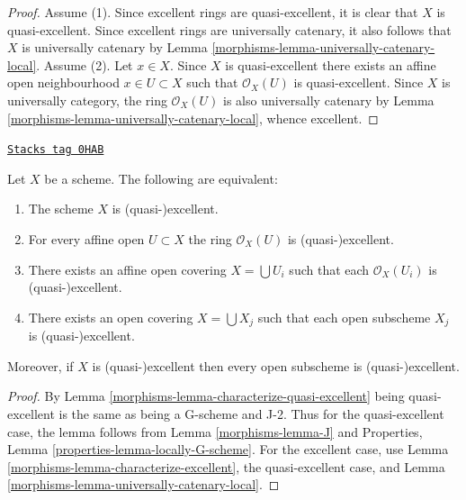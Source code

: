 \begin{proof}

Assume (1). Since excellent rings are quasi-excellent, it is clear
that $X$ is quasi-excellent. Since excellent rings are universally
catenary, it also follows that $X$ is universally catenary by
Lemma \ref{morphisms-lemma-universally-catenary-local}. Assume (2).
Let $x \in X$. Since $X$ is quasi-excellent there exists
an affine open neighbourhood $x \in U \subset X$
such that $\mathcal{O}_X(U)$ is quasi-excellent. Since
$X$ is universally category, the ring $\mathcal{O}_X(U)$ is also
universally catenary by Lemma \ref{morphisms-lemma-universally-catenary-local},
whence excellent.
\end{proof}

\begin{lemma}
\label{morphisms-lemma-locally-excellent}
\href{https://stacks.math.columbia.edu/tag/0HAB}{\texttt{Stacks tag 0HAB}}

Let $X$ be a scheme. The following are equivalent:
\begin{enumerate}
\item The scheme $X$ is (quasi-)excellent.
\item For every affine open $U \subset X$ the ring $\mathcal{O}_X(U)$
is (quasi-)excellent.
\item There exists an affine open covering $X = \bigcup U_i$ such that
each $\mathcal{O}_X(U_i)$ is (quasi-)excellent.
\item There exists an open covering $X = \bigcup X_j$
such that each open subscheme $X_j$ is (quasi-)excellent.
\end{enumerate}
Moreover, if $X$ is (quasi-)excellent then every open subscheme
is (quasi-)excellent.
\end{lemma}

\begin{proof}

By Lemma \ref{morphisms-lemma-characterize-quasi-excellent} being
quasi-excellent is the same as being a G-scheme and J-2.
Thus for the quasi-excellent case, the lemma follows from
Lemma \ref{morphisms-lemma-J} and
Properties, Lemma \ref{properties-lemma-locally-G-scheme}.
For the excellent case, use Lemma \ref{morphisms-lemma-characterize-excellent},
the quasi-excellent case, and Lemma \ref{morphisms-lemma-universally-catenary-local}.
\end{proof}

